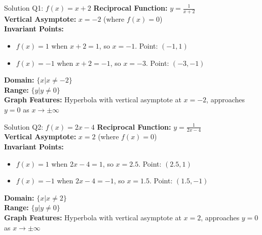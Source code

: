 \documentclass[aspectratio=169]{beamer}
\begin{document}
\begin{frame}{Solution Q1: $f(x) = x + 2$}
    \footnotesize
    \textbf{Reciprocal Function:} $y = \frac{1}{x + 2}$\\
    \vspace{0.5em}
    \textbf{Vertical Asymptote:} $x = -2$ (where $f(x) = 0$)\\
    \vspace{0.5em}
    \textbf{Invariant Points:}
    \begin{itemize}
        \item $f(x) = 1$ when $x + 2 = 1$, so $x = -1$. Point: $(-1, 1)$
        \item $f(x) = -1$ when $x + 2 = -1$, so $x = -3$. Point: $(-3, -1)$
    \end{itemize}
    \vspace{0.5em}
    \textbf{Domain:} $\{x | x \neq -2\}$\\
    \textbf{Range:} $\{y | y \neq 0\}$\\
    \vspace{0.5em}
    \textbf{Graph Features:} Hyperbola with vertical asymptote at $x = -2$, approaches $y = 0$ as $x \to \pm\infty$
\end{frame}

\begin{frame}{Solution Q2: $f(x) = 2x - 4$}
    \footnotesize
    \textbf{Reciprocal Function:} $y = \frac{1}{2x - 4}$\\
    \vspace{0.5em}
    \textbf{Vertical Asymptote:} $x = 2$ (where $f(x) = 0$)\\
    \vspace{0.5em}
    \textbf{Invariant Points:}
    \begin{itemize}
        \item $f(x) = 1$ when $2x - 4 = 1$, so $x = 2.5$. Point: $(2.5, 1)$
        \item $f(x) = -1$ when $2x - 4 = -1$, so $x = 1.5$. Point: $(1.5, -1)$
    \end{itemize}
    \vspace{0.5em}
    \textbf{Domain:} $\{x | x \neq 2\}$\\
    \textbf{Range:} $\{y | y \neq 0\}$\\
    \vspace{0.5em}
    \textbf{Graph Features:} Hyperbola with vertical asymptote at $x = 2$, approaches $y = 0$ as $x \to \pm\infty$
\end{frame}
\end{document}

